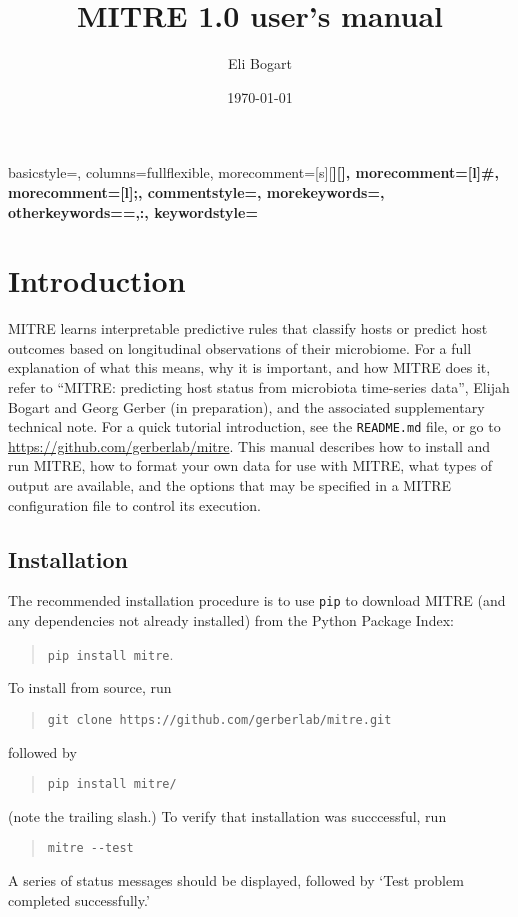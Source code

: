 \documentclass[12pt]{report}
\title{MITRE 1.0 user's manual}
\author{Eli Bogart}
\date{\today}
\begin{document}
\maketitle
\tableofcontents
{} 
{
    basicstyle=\ttfamily\small,
    columns=fullflexible,
    morecomment=[s][\color{blue}\bfseries]{[}{]},
    morecomment=[l]{\#},
    morecomment=[l]{;},
    commentstyle=\color{gray}\ttfamily,
    morekeywords={},
    otherkeywords={=,:},
    keywordstyle={\bfseries}
}

\chapter{Introduction}

MITRE learns interpretable predictive rules that classify hosts or
predict host outcomes based on longitudinal observations of their
microbiome.  For a full explanation of what this means, why it is
important, and how MITRE does it, refer to ``MITRE: predicting host
status from microbiota time-series data'', Elijah Bogart and Georg
Gerber (in preparation), and the associated supplementary technical
note. For a quick tutorial introduction, see the \texttt{README.md}
file, or go to \url{https://github.com/gerberlab/mitre}.  This manual
describes how to install and run MITRE, how to format your own data
for use with MITRE, what types of output are available, and the
options that may be specified in a MITRE configuration file to control
its execution.

\section{Installation}
The recommended installation procedure is to use \texttt{pip} to
download MITRE (and any dependencies not already installed) from the
Python Package Index:
\begin{quote}
  \texttt{pip install mitre}.
\end{quote}
To install from
source, run
\begin{quote}
  \texttt{git clone https://github.com/gerberlab/mitre.git}
\end{quote}
followed by
\begin{quote}
  \texttt{pip install mitre/}
\end{quote} 
(note the trailing slash.)  To
verify that installation was succcessful, run
\begin{quote}
  \texttt{mitre -{}-test}
\end{quote}
  A series of status messages should be displayed, followed by `Test
  problem completed successfully.'
\end{document}
